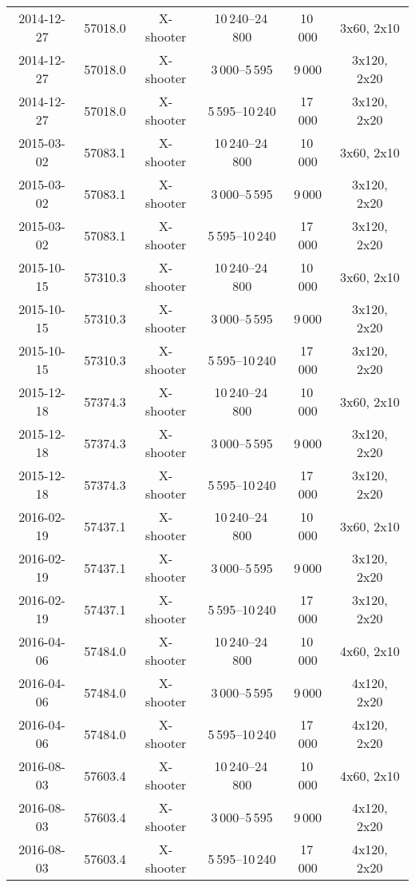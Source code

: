 \documentclass[structabstract]{aa}
\begin{document}
\begin{appendix}
\begin{longtable}{cccccc}
2014-12-27	&	57018.0	&	X-shooter	&	10\,240--24\,800	& 10\,000 &	3x60, 2x10	\\
2014-12-27 	&	57018.0	&	X-shooter	&	3\,000--5\,595	& 9\,000 &	3x120, 2x20	\\
2014-12-27 	&	57018.0	&	X-shooter	&	5\,595--10\,240	& 17\,000 &	3x120, 2x20	\\

2015-03-02	&	57083.1	&	X-shooter	&	10\,240--24\,800	& 10\,000 &	3x60, 2x10	\\
2015-03-02 	&	57083.1	&	X-shooter	&	3\,000--5\,595	& 9\,000 &	3x120, 2x20	\\
2015-03-02 	&	57083.1	&	X-shooter	&	5\,595--10\,240	& 17\,000 &	3x120, 2x20	\\

2015-10-15	&	57310.3	&	X-shooter	&	10\,240--24\,800	& 10\,000 &	3x60, 2x10	\\
2015-10-15 	&	57310.3	&	X-shooter	&	3\,000--5\,595	& 9\,000 &	3x120, 2x20	\\
2015-10-15 	&	57310.3	&	X-shooter	&	5\,595--10\,240	& 17\,000 &	3x120, 2x20	\\

2015-12-18	&	57374.3	&	X-shooter	&	10\,240--24\,800	& 10\,000 &	3x60, 2x10	\\
2015-12-18 	&	57374.3	&	X-shooter	&	3\,000--5\,595	& 9\,000 &	3x120, 2x20	\\
2015-12-18 	&	57374.3	&	X-shooter	&	5\,595--10\,240	& 17\,000 &	3x120, 2x20	\\

2016-02-19	&	57437.1	&	X-shooter	&	10\,240--24\,800	& 10\,000 &	3x60, 2x10	\\
2016-02-19 	&	57437.1	&	X-shooter	&	3\,000--5\,595	& 9\,000 &	3x120, 2x20	\\
2016-02-19 	&	57437.1	&	X-shooter	&	5\,595--10\,240	& 17\,000 &	3x120, 2x20	\\

2016-04-06	&	57484.0	&	X-shooter	&	10\,240--24\,800	& 10\,000 &	4x60, 2x10	\\
2016-04-06 	&	57484.0	&	X-shooter	&	3\,000--5\,595	& 9\,000 &	4x120, 2x20	\\
2016-04-06 	&	57484.0	&	X-shooter	&	5\,595--10\,240	& 17\,000 &	4x120, 2x20	\\

2016-08-03	&	57603.4	&	X-shooter	&	10\,240--24\,800	& 10\,000 &	4x60, 2x10	\\
2016-08-03 	&	57603.4	&	X-shooter	&	3\,000--5\,595	& 9\,000 &	4x120, 2x20	\\
2016-08-03 	&	57603.4	&	X-shooter	&	5\,595--10\,240	& 17\,000 &	4x120, 2x20	\\


\end{longtable}
\end{appendix}
\end{document}

